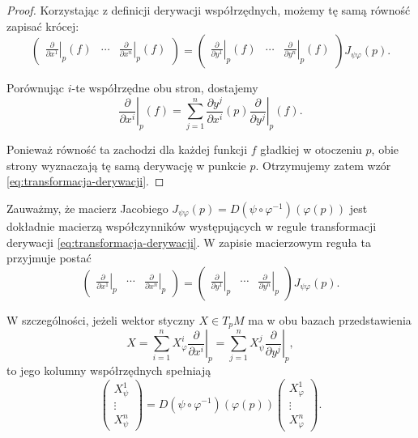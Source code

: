 \begin{proof}
Korzystając z definicji derywacji współrzędnych,
możemy tę samą równość zapisać krócej:
\[
\begin{pmatrix}
\displaystyle
\left.\frac{\partial}{\partial x^1}\right|_p(f)
&
\cdots
&
\displaystyle
\left.\frac{\partial}{\partial x^n}\right|_p(f)
\end{pmatrix}
=
\begin{pmatrix}
\displaystyle
\left.\frac{\partial}{\partial y^1}\right|_p(f)
&
\cdots
&
\displaystyle
\left.\frac{\partial}{\partial y^n}\right|_p(f)
\end{pmatrix}
J_{\psi\varphi}(p).
\]

Porównując $i$-te współrzędne obu stron,
dostajemy
\[
\left.\frac{\partial}{\partial x^i}\right|_p(f)
=
\sum_{j=1}^n
\frac{\partial y^j}{\partial x^i}(p)
\left.\frac{\partial}{\partial y^j}\right|_p(f).
\]

Ponieważ równość ta zachodzi dla każdej funkcji
$f$ gładkiej w otoczeniu $p$, obie strony
wyznaczają tę samą derywację w punkcie $p$.
Otrzymujemy zatem wzór
\eqref{eq:transformacja-derywacji}.
\end{proof}

Zauważmy, że macierz Jacobiego $J_{\psi\varphi}(p) = D(\psi\circ\varphi^{-1})(\varphi(p))$
jest dokładnie macierzą współczynników występujących
w regule transformacji derywacji
\eqref{eq:transformacja-derywacji}.
W zapisie macierzowym reguła ta przyjmuje postać
\[
\boxed{
\begin{pmatrix}
\displaystyle\left.\frac{\partial}{\partial x^1}\right|_p
&
\cdots
&
\displaystyle\left.\frac{\partial}{\partial x^n}\right|_p
\end{pmatrix}
=
\begin{pmatrix}
\displaystyle\left.\frac{\partial}{\partial y^1}\right|_p
&
\cdots
&
\displaystyle\left.\frac{\partial}{\partial y^n}\right|_p
\end{pmatrix}
J_{\psi\varphi}(p).
}
\]

W szczególności, jeżeli wektor styczny $X\in T_pM$
ma w obu bazach przedstawienia
\[
X=
\sum_{i=1}^n X_\varphi^i
\left.\frac{\partial}{\partial x^i}\right|_p
=
\sum_{j=1}^n X_\psi^j
\left.\frac{\partial}{\partial y^j}\right|_p,
\]
to jego kolumny współrzędnych spełniają
\[
\boxed{
\begin{pmatrix}
X_\psi^1\\
\vdots\\
X_\psi^n
\end{pmatrix}
=
D(\psi\circ\varphi^{-1})(\varphi(p))
\begin{pmatrix}
X_\varphi^1\\
\vdots\\
X_\varphi^n
\end{pmatrix}.
}
\]

